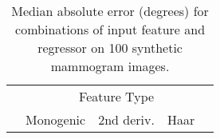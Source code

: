 \begin{table}[t]
\centering
\begin{tabular}{l|c c c c}
							& \multicolumn{4}{c}{Feature Type} \\
							& Monogenic		& 2nd deriv.	& Haar				& \dtcwt{} \\
\hline

\end{tabular}
%
\caption{Median absolute error (degrees) for combinations of input feature and regressor on 100 synthetic mammogram images.}
\label{t:synth_mammography}
\end{table}
